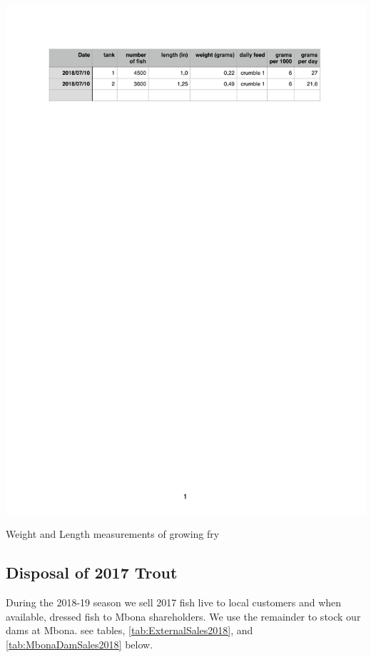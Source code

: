 \begin{table}[H]
  \centering
  \includegraphics[scale = 0.9]{tables/TablesFryGrowth.pdf}
   \caption{Weight and Length measurements of growing fry}
   \label{tab:FryGrowth}
\end{table}

\subsection{Disposal of 2017 Trout}

During the 2018-19 season we sell 2017 fish live to local customers and 
when available, dressed fish to Mbona shareholders. We use the remainder
to stock our dams at Mbona. see tables, \ref{tab:ExternalSales2018}, 
 and \ref{tab:MbonaDamSales2018} below.

